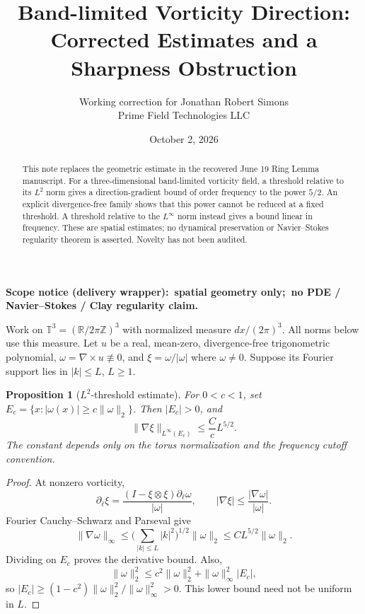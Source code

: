 \documentclass[11pt]{article}
\title{Band-limited Vorticity Direction: Corrected Estimates and a Sharpness Obstruction}
\author{Working correction for Jonathan Robert Simons\\Prime Field Technologies LLC}
\date{October 2, 2026}
\newtheorem{proposition}{Proposition}
\begin{document}
\maketitle
\begin{center}\footnotesize\bfseries
Scope notice (delivery wrapper):\ spatial geometry only;\ no PDE / Navier--Stokes / Clay regularity claim.
\end{center}
\vspace{0.75em}
\begin{abstract}
This note replaces the geometric estimate in the recovered June 19 Ring Lemma manuscript. For a three-dimensional band-limited vorticity field, a threshold relative to its $L^2$ norm gives a direction-gradient bound of order frequency to the power $5/2$. An explicit divergence-free family shows that this power cannot be reduced at a fixed threshold. A threshold relative to the $L^\infty$ norm instead gives a bound linear in frequency. These are spatial estimates; no dynamical preservation or Navier--Stokes regularity theorem is asserted. Novelty has not been audited.
\end{abstract}

Work on $\mathbb T^3=(\mathbb R/2\pi\mathbb Z)^3$ with normalized measure $dx/(2\pi)^3$. All norms below use this measure. Let $u$ be a real, mean-zero, divergence-free trigonometric polynomial, $\omega=\nabla\times u\not\equiv0$, and $\xi=\omega/|\omega|$ where $\omega\ne0$. Suppose its Fourier support lies in $|k|\le L$, $L\ge1$.

\begin{proposition}[$L^2$-threshold estimate]
For $0<c<1$, set $E_c=\{x:|\omega(x)|\ge c\|\omega\|_2\}$. Then $|E_c|>0$, and
\[
 \|\nabla\xi\|_{L^\infty(E_c)}\le \frac{C}{c}L^{5/2}.
\]
The constant depends only on the torus normalization and the frequency cutoff convention.
\end{proposition}
\begin{proof}
At nonzero vorticity,
\[
 \partial_\ell\xi=\frac{(I-\xi\otimes\xi)\partial_\ell\omega}{|\omega|},
 \qquad |\nabla\xi|\le\frac{|\nabla\omega|}{|\omega|}.
\]
Fourier Cauchy--Schwarz and Parseval give
\[
 \|\nabla\omega\|_\infty
 \le\Big(\sum_{|k|\le L}|k|^2\Big)^{1/2}\|\omega\|_2
 \le C L^{5/2}\|\omega\|_2.
\]
Dividing on $E_c$ proves the derivative bound. Also,
\[
 \|\omega\|_2^2\le c^2\|\omega\|_2^2+\|\omega\|_\infty^2|E_c|,
\]
so $|E_c|\ge(1-c^2)\|\omega\|_2^2/\|\omega\|_\infty^2>0$. This lower bound need not be uniform in $L$.
\end{proof}
\end{document}
